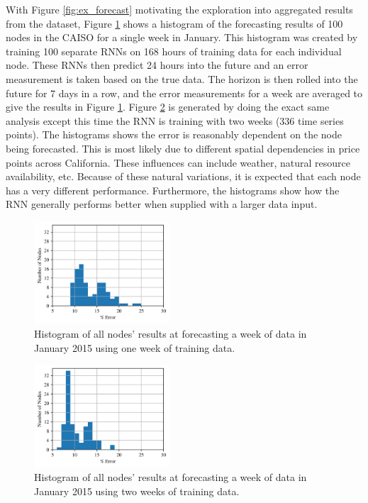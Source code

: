 \documentclass[sigconf]{acmart}
\begin{document}
With Figure \ref{fig:ex_forecast} motivating the exploration into aggregated results from the dataset, Figure \ref{fig:hist_small} shows a histogram of the forecasting results of 100 nodes in the CAISO for a single week in January. This histogram was created by training 100 separate RNNs on 168 hours of training data for each individual node. These RNNs then predict 24 hours into the future and an error measurement is taken based on the true data. The horizon is then rolled into the future for 7 days in a row, and the error measurements for a week are averaged to give the results in Figure \ref{fig:hist_small}. Figure \ref{fig:hist_large} is generated by doing the exact same analysis except this time the RNN is training with two weeks (336 time series points). The histograms shows the error is reasonably dependent on the node being forecasted. This is most likely due to different spatial dependencies in price points across California. These influences can include weather, natural resource availability, etc. Because of these natural variations, it is expected that each node has a very different performance. Furthermore, the histograms show how the RNN generally performs better when supplied with a larger data input.

\begin{figure}[h]
\includegraphics[width=0.45\textwidth]{fig_5.png}
\caption{Histogram of all nodes' results at forecasting a week of data in January 2015 using one week of training data.}
\label{fig:hist_small}
\end{figure}

\begin{figure}[h]
\includegraphics[width=0.45\textwidth]{fig_5_1.png}
\caption{Histogram of all nodes' results at forecasting a week of data in January 2015 using two weeks of training data.}
\label{fig:hist_large}
\end{figure}
\end{document}
